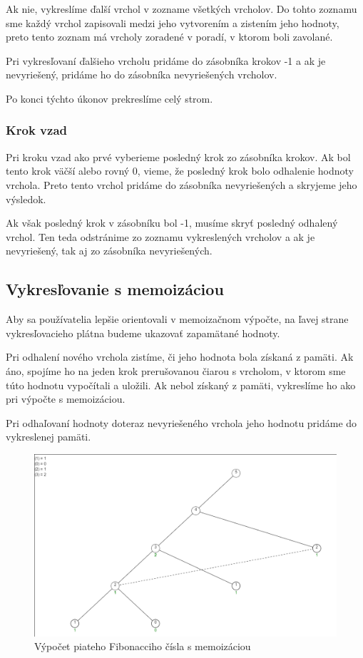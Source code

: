 Ak nie, vykreslíme ďalší vrchol v zozname všetkých vrcholov. Do tohto zoznamu sme
každý vrchol zapisovali medzi jeho vytvorením a zistením jeho hodnoty, preto
tento zoznam má vrcholy zoradené v poradí, v ktorom boli zavolané.

Pri vykresľovaní ďalšieho vrcholu pridáme do zásobníka krokov -1 a ak je nevyriešený,
pridáme ho do zásobníka nevyriešených vrcholov.

Po konci týchto úkonov prekreslíme celý strom.
\subsubsection{Krok vzad}
Pri kroku vzad ako prvé vyberieme posledný krok zo zásobníka krokov. Ak bol tento
krok väčší alebo rovný 0, vieme, že posledný krok bolo odhalenie hodnoty vrchola.
Preto tento vrchol pridáme do zásobníka nevyriešených a skryjeme jeho výsledok.

Ak však posledný krok v zásobníku bol -1, musíme skryť posledný odhalený vrchol.
Ten teda odstránime zo zoznamu vykreslených vrcholov a ak je nevyriešený, tak aj
zo zásobníka nevyriešených.
\subsection{Vykresľovanie s memoizáciou}
Aby sa používatelia lepšie orientovali v memoizačnom výpočte, na ľavej strane
vykresľovacieho plátna budeme ukazovať zapamätané hodnoty.

Pri odhalení nového vrchola zistíme, či jeho hodnota bola získaná z pamäti.
Ak áno, spojíme ho na jeden krok prerušovanou
čiarou s vrcholom, v ktorom sme túto hodnotu vypočítali a uložili. Ak nebol získaný
z pamäti, vykreslíme ho ako pri výpočte s memoizáciou.

Pri odhaľovaní hodnoty doteraz nevyriešeného vrchola jeho hodnotu pridáme do vykreslenej pamäti.
\begin{figure}[h]
\includegraphics[width=\linewidth]{images/memoizacia.png}
\caption{Výpočet piateho Fibonacciho čísla s memoizáciou}
\label{obr:memo}
\end{figure}
